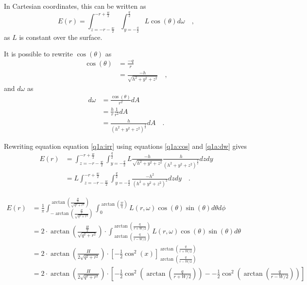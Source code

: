 \documentclass{report}
\begin{document}
In Cartesian coordinates, this can be written as
\begin{equation}
E(r) = \int_{z= -r - \frac{w}{2}}^{-r+\frac{w}{2}} \int_{y= - \frac{q}{2}}^{\frac{q}{2}} L \cos(\theta) d\omega
\quad,
\label{q1a:irr}
\end{equation}
as $L$ is constant over the surface.

It is possible to rewrite $\cos(\theta)$ as
\begin{align}
\cos(\theta)  &= \frac{-q}{r} \\
              &= \frac{-h}{\sqrt{h^2 + y^2 + z^2}}
\quad,
\label{q1a:cos}
\end{align}
and $d\omega$ as
\begin{align}
d\omega &= \frac{\cos(\theta)}{r^2} dA \\
        &= \frac{h}{r} \frac{1}{r^2} dA \\
        &= \frac{h}{\left(h^2 + y^2 + z^2\right)^\frac{3}{2}} dA
\quad.
\label{q1a:dw}
\end{align}

Rewriting equation equation \eqref{q1a:irr} using equations \eqref{q1a:cos} and \eqref{q1a:dw} gives
\begin{align}
E(r) &= \int_{z= -r - \frac{w}{2}}^{-r+\frac{w}{2}} \int_{y= - \frac{q}{2}}^{\frac{q}{2}} L \frac{-h}{\sqrt{h^2 + y^2 + z^2}} \frac{h}{\left(h^2 + y^2 + z^2\right)^\frac{3}{2}} dzdy \\
     &= L \int_{z= -r - \frac{w}{2}}^{-r+\frac{w}{2}} \int_{y= - \frac{q}{2}}^{\frac{q}{2}} \frac{-h^2}{\left(h^2 + y^2 + z^2\right)^2} dzdy
\quad.
\end{align}


\begin{align*}
E(r) &= \frac{1}{\pi} \int_{-\arctan(\frac{\frac{H}{2}}{\sqrt{q^2+r^2}})}^{\arctan(\frac{\frac{H}{2}}{\sqrt{q^2+r^2}})} \int_{0}^{\arctan(\frac{w}{q})} L(r,\omega)\cos(\theta) \sin(\theta) d\theta d\phi \\
     &= 2 \cdot \arctan(\frac{\frac{H}{2}}{\sqrt{q^2+r^2}}) \cdot \int_{\arctan(\frac{q}{r-W/2})}^{\arctan(\frac{q}{r+W/2})} L(r,\omega)\cos(\theta) \sin(\theta) d\theta \\
     &= 2 \cdot \arctan(\frac{H}{2\sqrt{q^2+r^2}}) \cdot \left[ - \frac{1}{2} \cos^2(x) \right]_{\arctan(\frac{q}{r-W/2})}^{\arctan(\frac{q}{r+W/2})} \\
     &= 2 \cdot \arctan(\frac{H}{2\sqrt{q^2+r^2}}) \cdot \left[ - \frac{1}{2} \cos^2(\arctan(\frac{q}{r+W/2})) - - \frac{1}{2} \cos^2(\arctan(\frac{q}{r-W/2})) \right] \\
\end{align*}
\end{document}
